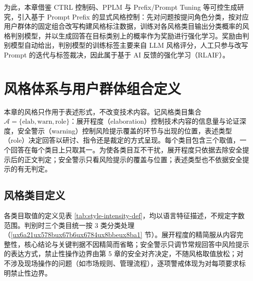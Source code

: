\documentclass[fontset=fandol,type=master,campus=shenzhen,etitleauto=true]{hithesisbook}
\begin{document}
为此，本章借鉴 CTRL 控制码、PPLM 与 Prefix/Prompt Tuning 等可控生成研究\cite{ref36,ref37,ref38,ref39}，引入基于 Prompt Prefix 的显式风格控制：先对问题按提问角色分类，按对应用户群体的固定组合改写构建风格标注数据，训练对各风格类目输出分类概率的风格判别模型，并以生成回答在目标类别上的概率作为奖励进行强化学习。奖励由判别模型自动给出，判别模型的训练标签主要来自 LLM 风格评分，人工只参与改写 Prompt 的迭代与标签裁决，因此属于基于 AI 反馈的强化学习（RLAIF）\cite{ref44,ref90}。

\section{风格体系与用户群体组合定义}\label{ux4e09ux7c7bux98ceux683c-prefix-ux5b9aux4e49}

本章的风格只作用于表述形式，不改变技术内容。记风格类目集合 $\mathcal{A} = \{\text{elab}, \text{warn}, \text{role}\}$：展开程度（elaboration）控制技术内容的信息量与论证深度，安全警示（warning）控制风险提示覆盖的环节与出现的位置，表述类型（role）决定回答以研讨、指令还是裁定的方式呈现。每个类目包含三个取值，一个回答在每个类目上只取其一。为使各类目互不干扰，展开程度只依据去除安全提示后的正文判定；安全警示只看风险提示的覆盖与位置；表述类型也不依据安全提示的有无判定。

\subsection{风格类目定义}\label{ux98ceux683cux5f3aux5ea6ux7b49ux7ea7ux5212ux5206}

各类目取值的定义见表 \ref{tab:style-intensity-def}，均以语言特征描述，不规定字数范围。判别时三个类目统一按 3 类分类处理（\ref{ux6a21ux578bux67b6ux6784ux8bbeux8ba1} 节）。展开程度的精简服从内容完整性，核心结论与关键判据不因精简而省略；安全警示只调节常规回答中风险提示的表达方式，禁止性操作边界由第 5 章的安全对齐决定，不随风格取值放松；对不涉及现场操作的问题（如市场规则、管理流程），逐项警戒体现为对每项要求标明禁止性边界。
\end{document}
